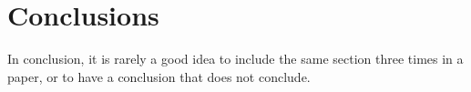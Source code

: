 





\section{Conclusions}

In conclusion, it is rarely a good idea to include the same section three times in a paper, or to have a conclusion that does not conclude.

\appendix



%

